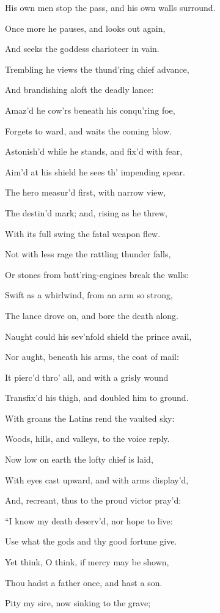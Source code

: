 His own men stop the pass, and his own walls surround.

Once more he pauses, and looks out again,

And seeks the goddess charioteer in vain.

Trembling he views the thund’ring chief advance,

And brandishing aloft the deadly lance:

Amaz’d he cow’rs beneath his conqu’ring foe,

Forgets to ward, and waits the coming blow.

Astonish’d while he stands, and fix’d with fear,

Aim’d at his shield he sees th’ impending spear.

The hero measur’d first, with narrow view,

The destin’d mark; and, rising as he threw,

With its full swing the fatal weapon flew.

Not with less rage the rattling thunder falls,

Or stones from batt’ring-engines break the walls:

Swift as a whirlwind, from an arm so strong,

The lance drove on, and bore the death along.

Naught could his sev’nfold shield the prince avail,

Nor aught, beneath his arms, the coat of mail:

It pierc’d thro’ all, and with a grisly wound

Transfix’d his thigh, and doubled him to ground.

With groans the Latins rend the vaulted sky:

Woods, hills, and valleys, to the voice reply.

Now low on earth the lofty chief is laid,

With eyes cast upward, and with arms display’d,

And, recreant, thus to the proud victor pray’d:

“I know my death deserv’d, nor hope to live:

Use what the gods and thy good fortune give.

Yet think, O think, if mercy may be shown,

Thou hadst a father once, and hast a son.

Pity my sire, now sinking to the grave;

